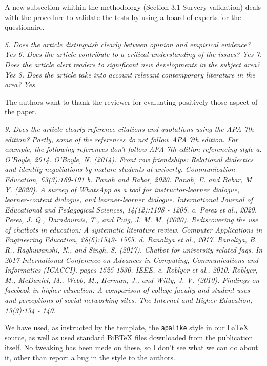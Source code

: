 \documentclass{letter}
\begin{document}
A new subsection whithin the methodology (Section 3.1 Survery validation) deals with the procedure to validate the tests by using a board of experts for the questionaire.



{\it 5.      Does the article distinguish clearly between opinion and empirical evidence? Yes
6.      Does the article contribute to a critical understanding of the issues? Yes
7.      Does the article alert readers to significant new developments in the subject area? Yes
8.      Does the article take into account relevant contemporary literature in the area? Yes.}

The authors want to thank the reviewer for evaluating positively those aspect of the paper.


{\it 9.      Does the article clearly reference citations and quotations using the APA 7th edition? Partly, some of the references do not follow APA 7th edition. For example, the following references don't follow APA 7th edition referencing style
     a.   O'Boyle, 2014. O'Boyle, N. (2014). Front row friendships: Relational dialectics and identity negotiations by mature students at univerty. Communication Education, 63(3):169-191
     b. Panah and Babar, 2020. Panah, E. and Babar, M. Y. (2020). A survey of WhatsApp as a tool for instructor-learner dialogue, learner-content dialogue, and learner-learner dialogue. International Journal of Educational and Pedagogical
 Sciences, 14(12):1198 - 1205.
     c. Perez et al., 2020. Perez, J. Q., Daradoumis, T., and Puig, J. M. M. (2020). Rediscovering the use of chatbots in education: A systematic literature review. Computer Applications in Engineering Education, 28(6):1549- 1565.
     d. Ranoliya et al., 2017. Ranoliya, B. R., Raghuwanshi, N., and Singh, S. (2017). Chatbot for university related faqs. In 2017 International Conference on Advances in Computing, Communications and Informatics (ICACCI), pages 1525-1530. IEEE.
     e. Roblyer et al., 2010. Roblyer, M., McDaniel, M., Webb, M., Herman, J., and Witty, J. V. (2010). Findings on facebook in higher education: A comparison of college faculty and student uses and perceptions of social networking sites. The Internet and Higher Education, 13(3):134 - 140.}

 We have used, as instructed by the template, the {\tt apalike} style in our
  LaTeX source, as well as used standard BiBTeX files downloaded from the
  publication itself. No tweaking has been mede on these, so I don't see what we
  can do about it, other than report a bug in the style to the authors.
\end{document}
